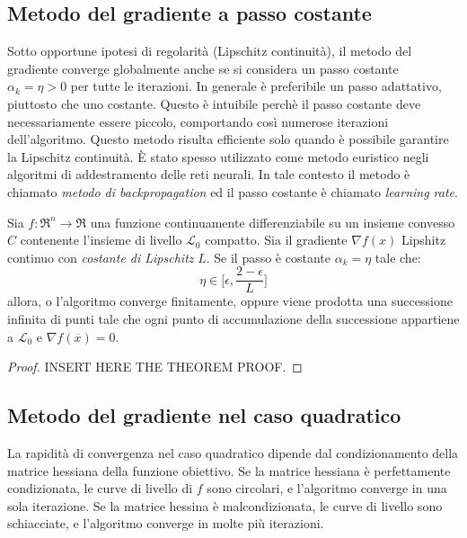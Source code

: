 \subsection{Metodo del gradiente a passo costante}
\label{sec:methods.gradient.constant.pace}
Sotto opportune ipotesi di regolarità (Lipschitz continuità), il metodo del gradiente converge globalmente anche se si considera un passo costante $\alpha_{k}=\eta>0$ per tutte le iterazioni.
In generale è preferibile un passo adattativo, piuttosto che uno costante. Questo è intuibile perchè il passo costante deve necessariamente essere piccolo, comportando così numerose iterazioni dell'algoritmo. Questo metodo risulta efficiente solo quando è possibile garantire la Lipschitz continuità. È stato spesso utilizzato come metodo euristico negli algoritmi di addestramento delle reti neurali. In tale contesto il metodo è chiamato \textit{metodo di backpropagation} ed il passo costante è chiamato \textit{learning rate}.

\begin{theorem}
	\label{thm:methods.gradient.convergence.constant.pace}
	Sia $f:\Re^{n}\rightarrow\Re$ una funzione continuamente differenziabile su	un insieme convesso $C$ contenente l'insieme di livello $\mathcal{L}_{0}$ compatto.	Sia il gradiente $\nabla f(x)$ Lipshitz continuo con \textit{costante di Lipschitz} $L$.
  Se il passo è costante $\alpha_{k}=\eta$ tale che:
  \begin{equation}
    \label{eqn:methods.gradient.constant.pace}
    \eta\in\Big[\epsilon,\frac{2-\epsilon}{L}\Big]
  \end{equation}
  allora, o l'algoritmo converge finitamente, oppure viene prodotta una successione infinita di punti tale che ogni punto di accumulazione della successione appartiene a $\mathcal{L}_{0}$ e $\nabla f(\overline{x})=0$.

  \begin{proof}
  	INSERT HERE THE THEOREM PROOF.
  \end{proof}
\end{theorem}


\subsection{Metodo del gradiente nel caso quadratico}
\label{sec:methods.gradient.quadratic}
La rapidità di convergenza nel caso quadratico dipende dal condizionamento della matrice hessiana della funzione obiettivo.
Se la matrice hessiana è perfettamente condizionata, le curve di livello di $f$ sono circolari, e l'algoritmo converge in una sola iterazione.
Se la matrice hessina è malcondizionata, le curve di livello sono schiacciate, e l'algoritmo converge in molte più iterazioni.

